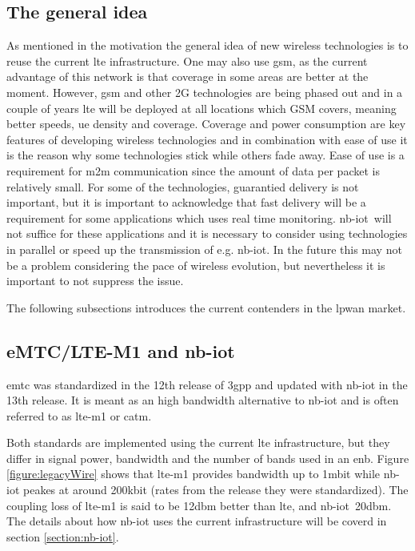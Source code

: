 \documentclass[USenglish]{ifimaster}  %
\begin{document}
\subsection{The general idea}
As mentioned in the motivation the general idea of new wireless technologies is to reuse the current \acrshort{lte} infrastructure. One may also use \acrshort{gsm}, as the current advantage of this network is that coverage in some areas are better at the moment. However, \acrshort{gsm} and other 2G technologies are being phased out and in a couple of years \acrshort{lte} will be deployed at all locations which GSM covers, meaning better speeds, \acrshort{ue} density and coverage. Coverage and power consumption are key features of developing wireless technologies and in combination with ease of use it is the reason why some technologies stick while others fade away. Ease of use is a requirement for \acrshort{m2m} communication since the amount of data per packet is relatively small. For some of the technologies, guarantied delivery is not important, but it is important to acknowledge that fast delivery will be a requirement for some applications which uses real time monitoring.
\acrshort{nb-iot} will not suffice for these applications and it is necessary to consider using technologies in parallel or speed up the transmission of e.g. \acrshort{nb-iot}. In the future this may not be a problem considering the pace of wireless evolution, but nevertheless it is important to not suppress the issue.

The following subsections introduces the current contenders in the \acrshort{lpwan} market.

\subsection{eMTC/LTE-M1 and \acrshort{nb-iot}}
\acrfull{emtc} was standardized in the 12th release of \acrshort{3gpp} and updated with \acrshort{nb-iot} in the 13th release. It is meant as an high bandwidth alternative to \acrshort{nb-iot} and is often referred to as \acrshort{lte-m1} or \acrshort{catm}.

Both standards are implemented using the current \acrshort{lte} infrastructure, but they differ in signal power, bandwidth and the number of bands used in an \acrshort{enb}. Figure \vref{figure:legacyWire} shows that \acrshort{lte-m1} provides bandwidth up to 1\acrshort{mbit} while \acrshort{nb-iot} peakes at around 200\acrshort{kbit} (rates from the release they were standardized). The coupling loss of \acrshort{lte-m1} is said to be 12\acrshort{dbm} better than \acrshort{lte}, and \acrshort{nb-iot} 20\acrshort{dbm}. The details about how \acrshort{nb-iot} uses the current infrastructure will be coverd in section \vref{section:nb-iot}.
\end{document}
